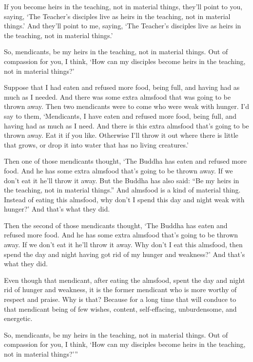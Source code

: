 \documentclass[12pt,openany]{book}%
\begin{document}
If you become heirs in the teaching, not in material things, they’ll point to you, saying, ‘The Teacher’s disciples live as heirs in the teaching, not in material things.’ And they’ll point to me, saying, ‘The Teacher’s disciples live as heirs in the teaching, not in material things.’ 

So, mendicants, be my heirs in the teaching, not in material things. Out of compassion for you, I think, ‘How can my disciples become heirs in the teaching, not in material things?’ 

Suppose that I had eaten and refused more food, being full, and having had as much as I needed. And there was some extra almsfood that was going to be thrown away. Then two mendicants were to come who were weak with hunger. I’d say to them, ‘Mendicants, I have eaten and refused more food, being full, and having had as much as I need. And there is this extra almsfood that’s going to be thrown away. Eat it if you like. Otherwise I’ll throw it out where there is little that grows, or drop it into water that has no living creatures.’ 

Then one of those mendicants thought, ‘The Buddha has eaten and refused more food. And he has some extra almsfood that’s going to be thrown away. If we don’t eat it he’ll throw it away. But the Buddha has also said: “Be my heirs in the teaching, not in material things.” And almsfood is a kind of material thing. Instead of eating this almsfood, why don’t I spend this day and night weak with hunger?’ And that’s what they did. 

Then the second of those mendicants thought, ‘The Buddha has eaten and refused more food. And he has some extra almsfood that’s going to be thrown away. If we don’t eat it he’ll throw it away. Why don’t I eat this almsfood, then spend the day and night having got rid of my hunger and weakness?’ And that’s what they did. 

Even though that mendicant, after eating the almsfood, spent the day and night rid of hunger and weakness, it is the former mendicant who is more worthy of respect and praise. Why is that? Because for a long time that will conduce to that mendicant being of few wishes, content, self-effacing, unburdensome, and energetic. 

So, mendicants, be my heirs in the teaching, not in material things. Out of compassion for you, I think, ‘How can my disciples become heirs in the teaching, not in material things?’” 
\end{document}
